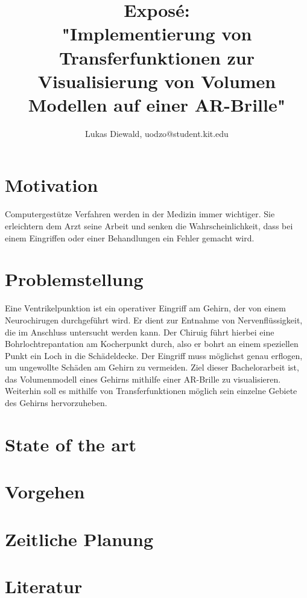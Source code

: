 \documentclass{article}
\title{
Exposé:\\
 \textbf{"Implementierung von Transferfunktionen zur Visualisierung von Volumen Modellen auf einer AR-Brille"}
}
\author{Lukas Diewald, uodzo@student.kit.edu}
\begin{document}
\maketitle

\clearpage
\section{Motivation}
Computergestütze Verfahren werden in der Medizin immer wichtiger. Sie erleichtern dem Arzt seine Arbeit und senken die Wahrscheinlichkeit, dass bei einem Eingriffen oder einer Behandlungen ein Fehler gemacht wird.

\section{Problemstellung}
Eine Ventrikelpunktion ist ein operativer Eingriff am Gehirn, der von einem Neurochirugen durchgeführt wird. Er dient zur Entnahme von Nervenflüssigkeit, die im Anschluss untersucht werden kann. Der Chiruig führt hierbei eine Bohrlochtrepantation am Kocherpunkt durch, also er bohrt an einem speziellen Punkt ein Loch in die Schädeldecke. Der Eingriff muss möglichst genau erflogen, um ungewollte Schäden am Gehirn zu vermeiden.
\newline
Ziel dieser Bachelorarbeit ist, das Volumenmodell eines Gehirns mithilfe einer AR-Brille zu visualisieren. Weiterhin soll es mithilfe von Transferfunktionen möglich sein einzelne Gebiete des Gehirns hervorzuheben.

\section{State of the art}

\section{Vorgehen}

\section{Zeitliche Planung}

\section{Literatur}
\end{document}
